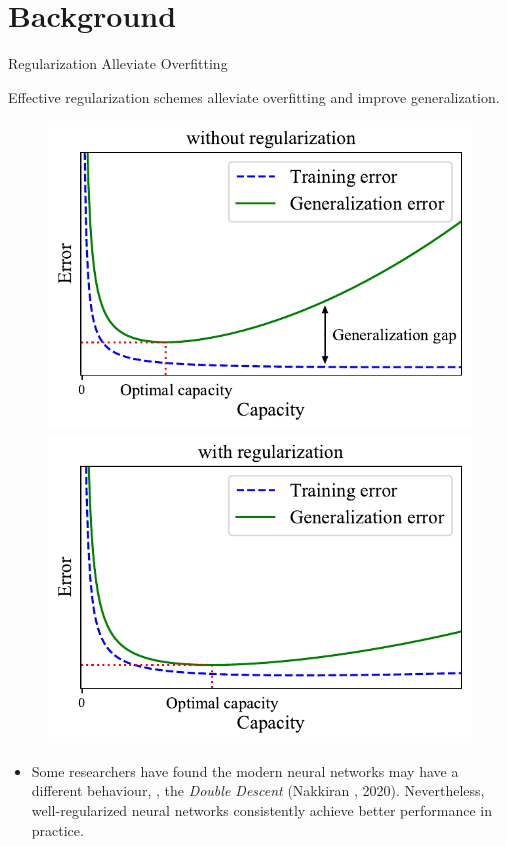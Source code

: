 \section{Background}


\begin{frame}{Regularization Alleviate Overfitting}




Effective regularization schemes alleviate overfitting and improve generalization.

\begin{figure}
\includegraphics[width=.45\textwidth]{figs/gap1.pdf}
\includegraphics[width=.45\textwidth]{figs/gap2.pdf}
\end{figure}
\vspace{-1em}
{\small
\begin{itemize}
    \item Some researchers have found the modern neural networks may have a different behaviour, \ie, the {\em Double Descent} (Nakkiran \etal, 2020). Nevertheless, well-regularized neural networks consistently achieve better performance in practice.
\end{itemize}
}

\end{frame}

